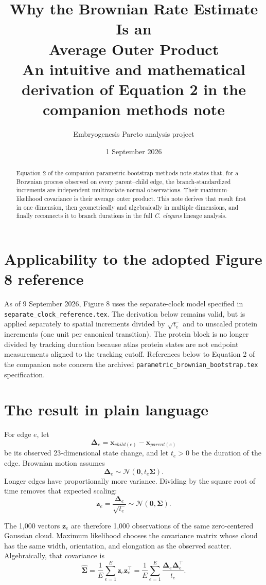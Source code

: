 \documentclass[10pt]{article}
\title{\textbf{Why the Brownian Rate Estimate Is an\\Average Outer Product}\\[2mm]
\large An intuitive and mathematical derivation of Equation 2 in the companion methods note}
\author{Embryogenesis Pareto analysis project}
\date{1 September 2026}
\newcommand{\Normal}{\mathcal{N}}
\begin{document}
\maketitle

\section*{Applicability to the adopted Figure 8 reference}
As of 9 September 2026, Figure 8 uses the separate-clock model specified in
\texttt{separate\_clock\_reference.tex}. The derivation below remains valid,
but is applied separately to spatial increments divided by $\sqrt{t_e}$
and to unscaled protein increments (one unit per canonical transition).
The protein block is no longer divided by tracking duration because atlas
protein states are not endpoint measurements aligned to the tracking cutoff.
References below to Equation 2 of the companion note concern the archived
\texttt{parametric\_brownian\_bootstrap.tex} specification.

\begin{abstract}
Equation 2 of the companion parametric-bootstrap methods note states that, for
a Brownian process observed on every parent--child edge, the branch-standardized
increments are independent multivariate-normal observations.  Their
maximum-likelihood covariance is their average outer product.  This note
derives that result first in one dimension, then geometrically and algebraically
in multiple dimensions, and finally reconnects it to branch durations in the
full \textit{C. elegans} lineage analysis.
\end{abstract}

\section{The result in plain language}

For edge $e$, let
\[
  \boldsymbol\Delta_e
  = \mathbf{x}_{child(e)}-\mathbf{x}_{parent(e)}
\]
be its observed 23-dimensional state change, and let $t_e>0$ be the duration of
the edge.  Brownian motion assumes
\[
  \boldsymbol\Delta_e
  \sim \Normal\!\left(\mathbf 0,t_e\boldsymbol\Sigma\right).
\]
Longer edges have proportionally more variance.  Dividing by the square root
of time removes that expected scaling:
\[
  \mathbf z_e=\frac{\boldsymbol\Delta_e}{\sqrt{t_e}}
  \sim\Normal(\mathbf0,\boldsymbol\Sigma).
\]

The 1,000 vectors $\mathbf z_e$ are therefore 1,000 observations of the same
zero-centered Gaussian cloud.  Maximum likelihood chooses the covariance
matrix whose cloud has the same width, orientation, and elongation as the
observed scatter.  Algebraically, that covariance is
\setcounter{equation}{1}
\begin{equation}
  \widehat{\boldsymbol\Sigma}
  =\frac{1}{E}\sum_{e=1}^{E}\mathbf z_e\mathbf z_e^\top
  =\frac{1}{E}\sum_{e=1}^{E}
    \frac{\boldsymbol\Delta_e\boldsymbol\Delta_e^\top}{t_e}.
  \label{eq:target}
\end{equation}
\end{document}
